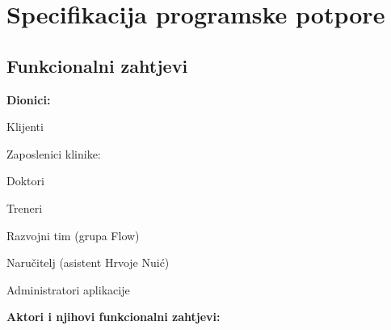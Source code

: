 \chapter{Specifikacija programske potpore}
		
	\section{Funkcionalni zahtjevi}
			
			\noindent \textbf{Dionici:}
			
			\begin{packed_enum}
				
				\item Klijenti
				\item Zaposlenici klinike:
					\begin{packed_enum}
						\item Doktori
						\item Treneri
					\end{packed_enum}
				\item Razvojni tim (grupa Flow)
				\item Naručitelj (asistent Hrvoje Nuić)
				\item Administratori aplikacije
				
			\end{packed_enum}
			
			\noindent \textbf{Aktori i njihovi funkcionalni zahtjevi:}
			
